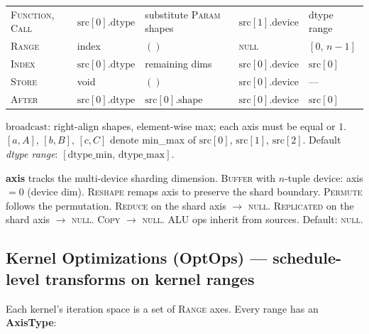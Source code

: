 \documentclass[10pt,letterpaper]{article}
\newcommand{\op}[1]{\textsc{#1}}
\begin{document}
\begin{tabular}{@{}l l l l l@{}}
\op{Function}, \op{Call} & $\mathrm{src}[0].\mathrm{dtype}$ & substitute \op{Param} shapes & $\mathrm{src}[1].\mathrm{device}$ & dtype range \\
\op{Range} & index & $()$ & \textsc{null} & $[0,\, n{-}1]$ \\
\op{Index} & $\mathrm{src}[0].\mathrm{dtype}$ & remaining dims & $\mathrm{src}[0].\mathrm{device}$ & $\mathrm{src}[0]$ \\
\op{Store} & void & $()$ & $\mathrm{src}[0].\mathrm{device}$ & --- \\
\op{After} & $\mathrm{src}[0].\mathrm{dtype}$ & $\mathrm{src}[0].\mathrm{shape}$ & $\mathrm{src}[0].\mathrm{device}$ & $\mathrm{src}[0]$ \\
\bottomrule
\end{tabular}

\smallskip
$\mathrm{broadcast}$: right-align shapes, element-wise max; each axis must be equal or $1$.
$[a,A]$, $[b,B]$, $[c,C]$ denote min\_max of $\mathrm{src}[0]$, $\mathrm{src}[1]$, $\mathrm{src}[2]$.
Default \emph{dtype range}: $[\mathrm{dtype\_min},\, \mathrm{dtype\_max}]$.

\medskip
\textbf{axis} tracks the multi-device sharding dimension. \op{Buffer} with $n$-tuple device: axis $= 0$ (device dim).
\op{Reshape} remaps axis to preserve the shard boundary. \op{Permute} follows the permutation.
\op{Reduce} on the shard axis $\to$ \textsc{null}. \op{Replicated} on the shard axis $\to$ \textsc{null}. \op{Copy} $\to$ \textsc{null}. ALU ops inherit from sources. Default: \textsc{null}.

\subsection*{Kernel Optimizations (OptOps) \normalfont\small--- schedule-level transforms on kernel ranges}

Each kernel's iteration space is a set of \op{Range} axes. Every range has an \textbf{AxisType}:
\end{document}
